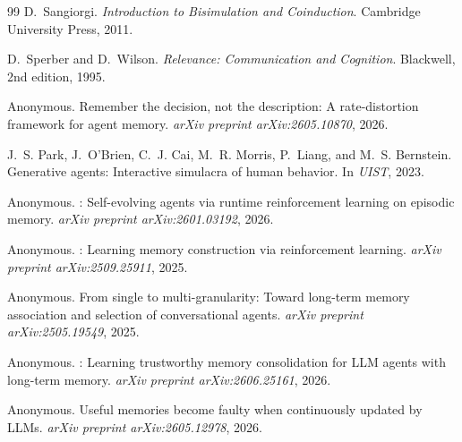 \documentclass{article}
\begin{document}
\begin{thebibliography}{99}
D.~Sangiorgi.
\newblock \emph{Introduction to Bisimulation and Coinduction}.
\newblock Cambridge University Press, 2011.

D.~Sperber and D.~Wilson.
\newblock \emph{Relevance: Communication and Cognition}.
\newblock Blackwell, 2nd edition, 1995.

Anonymous.
\newblock Remember the decision, not the description: A
rate-distortion framework for agent memory.
\newblock \emph{arXiv preprint arXiv:2605.10870}, 2026.

J.~S. Park, J.~O'Brien, C.~J. Cai, M.~R. Morris, P.~Liang, and
M.~S. Bernstein.
\newblock Generative agents: Interactive simulacra of human behavior.
\newblock In \emph{UIST}, 2023.

Anonymous.
: Self-evolving agents via runtime reinforcement
learning on episodic memory.
\newblock \emph{arXiv preprint arXiv:2601.03192}, 2026.

Anonymous.
: Learning memory construction via
reinforcement learning.
\newblock \emph{arXiv preprint arXiv:2509.25911}, 2025.

Anonymous.
\newblock From single to multi-granularity: Toward long-term memory
association and selection of conversational agents.
\newblock \emph{arXiv preprint arXiv:2505.19549}, 2025.

Anonymous.
: Learning trustworthy memory consolidation for
{LLM} agents with long-term memory.
\newblock \emph{arXiv preprint arXiv:2606.25161}, 2026.

Anonymous.
\newblock Useful memories become faulty when continuously updated by
{LLMs}.
\newblock \emph{arXiv preprint arXiv:2605.12978}, 2026.
\end{thebibliography}
\end{document}
